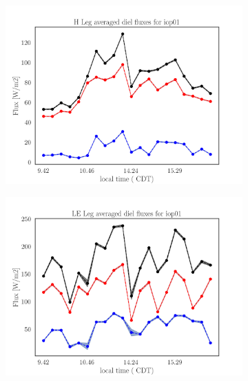 \documentclass[draft]{agujournal2019}
\begin{document}
 \begin{figure}[hbtp]
 \begin{subfigure}{0.49\textwidth}
     \includegraphics[width=\textwidth]{H_IOP01_diel.png}
     \label{fig:H_IOP01_diel}
 \end{subfigure}
 \hfill
 \begin{subfigure}{0.49\textwidth}
     \includegraphics[width=\textwidth]{LE_IOP01_diel.png}
     \label{fig:LE_IOP01_diel}
 \end{subfigure}
 

\end{figure}
\end{document}
